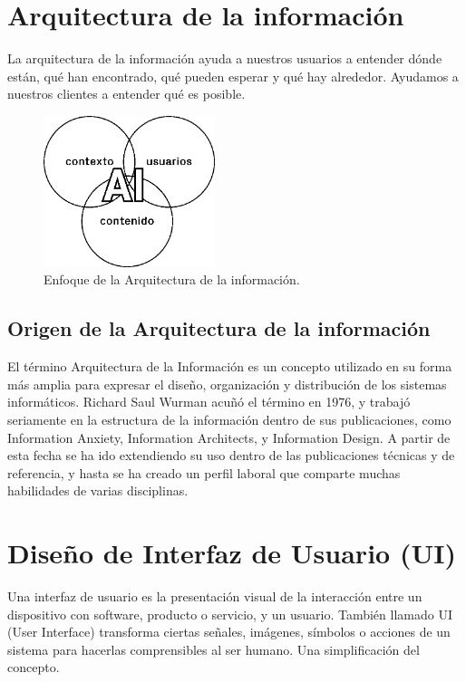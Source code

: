 \documentclass[11pt]{article}
\begin{document}
\section{Arquitectura de la información}
\label{sec:org81220c4}
\autocite{Rosenfeld_Morville_2002} La arquitectura de la información ayuda 
a nuestros usuarios a entender dónde están, qué han encontrado, qué pueden 
esperar y qué hay alrededor. Ayudamos a nuestros clientes a entender qué es 
posible.

\begin{figure}[htbp]
\centering
\includegraphics[width=5cm]{images/ai.png}
\caption{Enfoque de la Arquitectura de la información.}
\end{figure}

\subsection{Origen de la Arquitectura de la información}
\label{sec:org3589a1b}
\autocite{gonzales_2003} El término Arquitectura de la Información es un 
concepto utilizado en su forma más amplia para expresar el diseño, organización 
y distribución de los sistemas informáticos. Richard Saul Wurman acuñó el término
en 1976, y trabajó seriamente en la estructura de la información dentro de sus
publicaciones, como Information  Anxiety, Information Architects, y Information 
Design. A partir de esta fecha se ha ido extendiendo su uso dentro de las
publicaciones técnicas y de referencia, y hasta se ha creado un perfil 
laboral que comparte muchas habilidades de varias disciplinas.

\section{Diseño de Interfaz de Usuario (UI)}
\label{sec:org91bcf81}
\autocite{ovacen_2022} Una interfaz de usuario es la presentación visual de
la interacción entre un dispositivo con software, producto o servicio, y un
usuario. También llamado UI (User Interface) transforma ciertas señales, 
imágenes, símbolos o acciones de un sistema para hacerlas comprensibles al ser
humano. Una simplificación del concepto.
\end{document}
